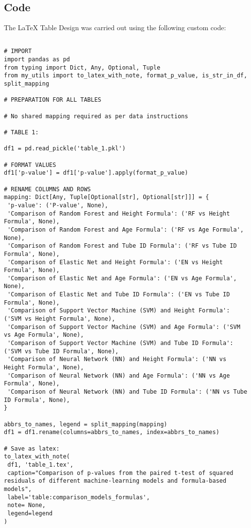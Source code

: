 \documentclass[11pt]{article}
\begin{document}
\subsection{{Code}}
The LaTeX Table Design was carried out using the following custom code:

\begin{verbatim}

# IMPORT
import pandas as pd
from typing import Dict, Any, Optional, Tuple
from my_utils import to_latex_with_note, format_p_value, is_str_in_df, split_mapping

# PREPARATION FOR ALL TABLES

# No shared mapping required as per data instructions

# TABLE 1:

df1 = pd.read_pickle('table_1.pkl')

# FORMAT VALUES
df1['p-value'] = df1['p-value'].apply(format_p_value)

# RENAME COLUMNS AND ROWS 
mapping: Dict[Any, Tuple[Optional[str], Optional[str]]] = {
 'p-value': ('P-value', None),
 'Comparison of Random Forest and Height Formula': ('RF vs Height Formula', None),
 'Comparison of Random Forest and Age Formula': ('RF vs Age Formula', None),
 'Comparison of Random Forest and Tube ID Formula': ('RF vs Tube ID Formula', None),
 'Comparison of Elastic Net and Height Formula': ('EN vs Height Formula', None),
 'Comparison of Elastic Net and Age Formula': ('EN vs Age Formula', None),
 'Comparison of Elastic Net and Tube ID Formula': ('EN vs Tube ID Formula', None),
 'Comparison of Support Vector Machine (SVM) and Height Formula': ('SVM vs Height Formula', None),
 'Comparison of Support Vector Machine (SVM) and Age Formula': ('SVM vs Age Formula', None),
 'Comparison of Support Vector Machine (SVM) and Tube ID Formula': ('SVM vs Tube ID Formula', None),
 'Comparison of Neural Network (NN) and Height Formula': ('NN vs Height Formula', None),
 'Comparison of Neural Network (NN) and Age Formula': ('NN vs Age Formula', None),
 'Comparison of Neural Network (NN) and Tube ID Formula': ('NN vs Tube ID Formula', None),
}

abbrs_to_names, legend = split_mapping(mapping)
df1 = df1.rename(columns=abbrs_to_names, index=abbrs_to_names)

# Save as latex:
to_latex_with_note(
 df1, 'table_1.tex',
 caption="Comparison of p-values from the paired t-test of squared residuals of different machine-learning models and formula-based models",
 label='table:comparison_models_formulas',
 note= None, 
 legend=legend
)

\end{verbatim}
\end{document}
